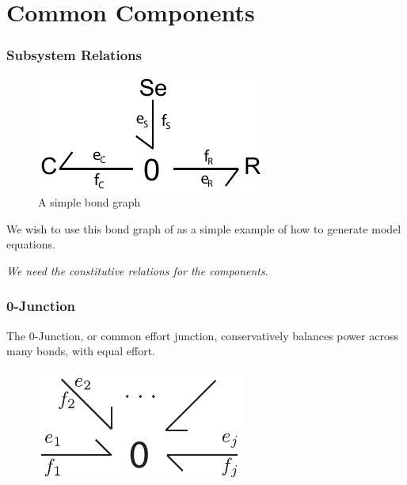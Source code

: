 \documentclass[11pt,reqno]{beamer}
\begin{document}
\section{Common Components}
\begin{frame}
\frametitle{Subsystem Relations}
\begin{figure}
\includegraphics{RC_bondgraph.pdf}
\caption{A simple bond graph}
\end{figure}
We wish to use this bond graph of as a simple example of how to generate model equations.
\vspace{10pt}

\begin{center}
\emph{We need the constitutive relations for the components}.
\end{center}

\begin{figure}
\end{figure}
\end{frame}
\begin{frame}
\frametitle{0-Junction}
The 0-Junction, or common effort junction, conservatively balances power across many bonds, with equal effort.
\begin{figure}
\includegraphics{nport-0.pdf}
\end{figure}
\end{frame}
\end{document}
